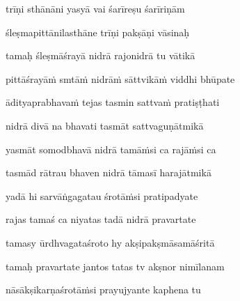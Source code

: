 trīṇi sthānāni yasyā vai śarīreṣu śarīriṇām \veg\dontdisplaylinenum

śleṣmapittānilasthāne trīṇi pakṣāṇi vāsinaḥ\thinspace{\dandab} \dontdisplaylinenum

tamaḥ śleṣmāśrayā nidrā rajonidrā tu vātikā \veg\dontdisplaylinenum
{}

pittāśrayāṁ smtāṁ nidrāṁ sāttvikāṁ viddhi bhūpate\thinspace{\dandab} \dontdisplaylinenum

ādityaprabhavaṁ tejas tasmin sattvaṁ pratiṣṭhati \veg\dontdisplaylinenum
{}

nidrā divā na bhavati tasmāt sattvaguṇātmikā\thinspace{\dandab} \dontdisplaylinenum

yasmāt somodbhavā nidrā tamāṁsi ca rajāṁsi ca \veg\dontdisplaylinenum
{}

tasmād rātrau bhaven nidrā tāmasī harajātmikā\thinspace{\dandab} \dontdisplaylinenum

yadā hi sarvāṅgagatau śrotāṁsi pratipadyate \veg\dontdisplaylinenum
{}

rajas tamaś ca niyatas tadā nidrā pravartate\thinspace{\dandab} \dontdisplaylinenum

tamasy ūrdhvagataśroto hy akṣipakṣmāsamāśritā \veg\dontdisplaylinenum
{}

tamaḥ pravartate jantos tatas tv akṣnor nimīlanam\thinspace{\dandab} \dontdisplaylinenum

nāsākṣikarṇaśrotāṁsi prayujyante kaphena tu \veg\dontdisplaylinenum
{}

